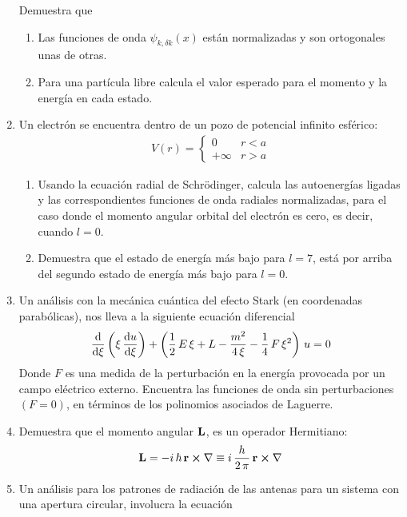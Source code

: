 \documentclass[12pt]{article}
\numberwithin{equation}{section}
\begin{document}
\begin{enumerate}
Demuestra que
\begin{enumerate}
\item Las funciones de onda $\psi_{k, \delta k} (x)$ están normalizadas y son ortogonales unas de otras.
\item Para una partícula libre calcula el valor esperado para el momento y la energía en cada estado. 
\end{enumerate}
\item Un electrón se encuentra dentro de un pozo de potencial infinito esférico:
\begin{align*}
V(r) = \begin{cases}
0 & r < a \\
+\infty & r > a
\end{cases}
\end{align*}
\begin{enumerate}
\item Usando la ecuación radial de Schrödinger, calcula las autoenergías ligadas y las correspondientes funciones de onda radiales normalizadas, para el caso donde el momento angular orbital del electrón es cero, es decir, cuando $l = 0$.
\item Demuestra que el estado de energía más bajo para $l = 7$, está por arriba del segundo estado de energía más bajo para $l = 0$.
\end{enumerate}
\item Un análisis con la mecánica cuántica del efecto Stark (en coordenadas parabólicas), nos lleva a la siguiente ecuación diferencial
\begin{align*}
\dv{\xi} \left( \xi \, \dv{u}{\xi}  \right) + \left( \dfrac{1}{2} \, E \, \xi + L - \dfrac{m^{2}}{4 \, \xi} - \dfrac{1}{4} \, F \, \xi^{2} \right) \, u = 0
\end{align*}
Donde $F$ es una medida de la perturbación en la energía provocada por un campo eléctrico externo. Encuentra las funciones de onda sin perturbaciones $(F=0)$, en términos de los polinomios asociados de Laguerre.
\item Demuestra que el momento angular $\vb{L}$, es un operador Hermitiano:
\begin{align*}
\vb{L} = - i\, \hbar \, \vb{r} \cp \nabla \equiv i \, \dfrac{h}{2 \, \pi} \, \vb{r} \cp \nabla
\end{align*}
\item Un análisis para los patrones de radiación de las antenas para un sistema con una apertura circular, involucra la ecuación

\end{enumerate}
\end{document}
